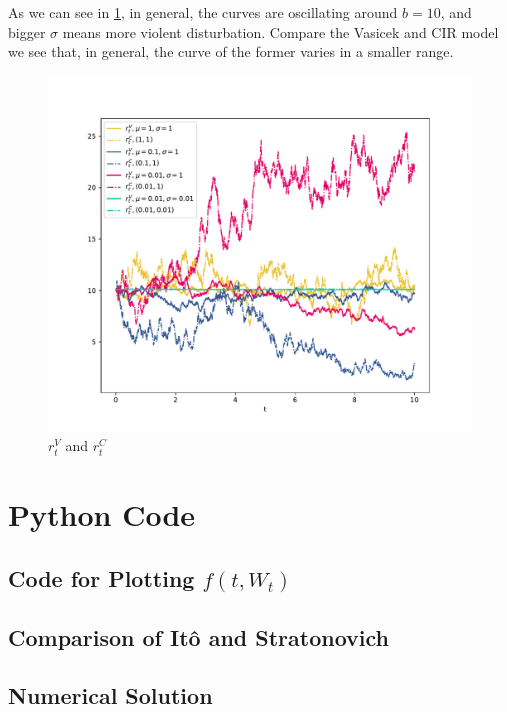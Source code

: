 \problem
As we can see in \cref{fig:num}, in general,
the curves are oscillating around $b=10$, and bigger $\sigma$ means
more violent disturbation.
Compare the Vasicek and CIR model we see that, in general,
the curve of the former varies in a smaller range.


\begin{figure}[h]
    \centering
    \includegraphics[width=\textwidth]{num}
    \caption{$r_t^V$ and $r_t^C$}
    \label{fig:num}
\end{figure}

\appendix
\section{Python Code}
\subsection{Code for Plotting $f(t,W_t)$}

\subsection{Comparison of It\^o and Stratonovich}

\subsection{Numerical Solution}
